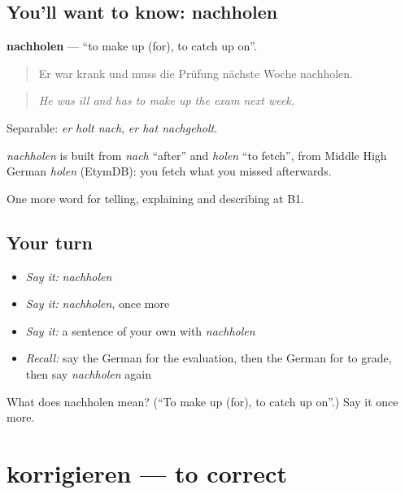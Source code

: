 \subsection*{You'll want to know: nachholen}
\textbf{nachholen} — \textquotedblleft{}to make up (for), to catch up on\textquotedblright{}.

\begin{quote}
Er war krank und muss die Prüfung nächste Woche nachholen.
\end{quote}

\begin{quote}
\emph{He was ill and has to make up the exam next week.}
\end{quote}

Separable: \emph{er holt nach}, \emph{er hat nachgeholt}.

\begin{cousinweb}
\emph{nachholen} is built from \emph{nach} \textquotedblleft{}after\textquotedblright{} and \emph{holen} \textquotedblleft{}to fetch\textquotedblright{}, from Middle High German \emph{holen} (EtymDB): you fetch what you missed afterwards.
\end{cousinweb}

\begin{grammarlens}[title={What you've built}]
One more word for telling, explaining and describing at B1.
\end{grammarlens}

\subsection*{Your turn}
\begin{itemize}
\raggedright
  \item \emph{Say it:} \emph{nachholen}
  \item \emph{Say it:} \emph{nachholen}, once more
  \item \emph{Say it:} a sentence of your own with \emph{nachholen}
  \item \emph{Recall:} say the German for the evaluation, then the German for to grade, then say \emph{nachholen} again
\end{itemize}

\begin{tcolorbox}[breakable,colback=teal!4,colframe=teal!35!black,title={Before you move on}]
What does nachholen mean? (\textquotedblleft{}To make up (for), to catch up on\textquotedblright{}.) Say it once more.
\end{tcolorbox}
\section[korrigieren]{korrigieren — to correct}

